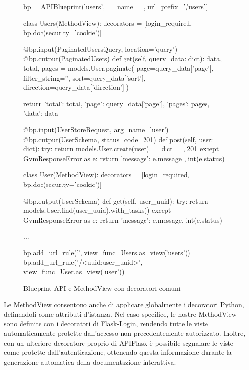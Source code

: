 \begin{figure}
\begin{pycode}
bp = APIBlueprint('users', __name__, url_prefix='/users')

class Users(MethodView):
    decorators = [login_required, bp.doc(security='cookie')]
    
    @bp.input(PaginatedUsersQuery, location='query')
    @bp.output(PaginatedUsers)
    def get(self, query_data: dict):
        data, total, pages = models.User.paginate(
            page=query_data['page'],
            filter_string='',
            sort=query_data['sort'],
            direction=query_data['direction']
        )
    
        return {
            'total': total,
            'page': query_data['page'],
            'pages': pages,
            'data': data
        }
    
    @bp.input(UserStoreRequest, arg_name='user')
    @bp.output(UserSchema, status_code=201)
    def post(self, user: dict):
        try:
            return models.User.create(user).__dict__, 201
        except GvmResponseError as e:
            return {
                'message': e.message
            }, int(e.status)
    
    
class User(MethodView):
    decorators = [login_required, bp.doc(security='cookie')]
    
    @bp.output(UserSchema)
    def get(self, user_uuid):
        try:
            return models.User.find(user_uuid).with_tasks()
        except GvmResponseError as e:
            return {'message': e.message}, int(e.status)
    
    ...

bp.add_url_rule('', view_func=Users.as_view('users'))
bp.add_url_rule('/<uuid:user_uuid>', view_func=User.as_view('user'))
\end{pycode}
\caption{Blueprint API e MethodView con decoratori comuni}
\end{figure}

Le MethodView consentono anche di applicare globalmente i decoratori Python, definendoli come attributi d'istanza. Nel caso specifico, le nostre MethodView sono definite con i decoratori di Flask-Login, rendendo tutte le viste automaticamente protette dall'accesso non precedentemente autorizzato. Inoltre, con un ulteriore decoratore proprio di APIFlask è possibile segnalare le viste come protette dall'autenticazione, ottenendo questa informazione durante la generazione automatica della documentazione interattiva.

